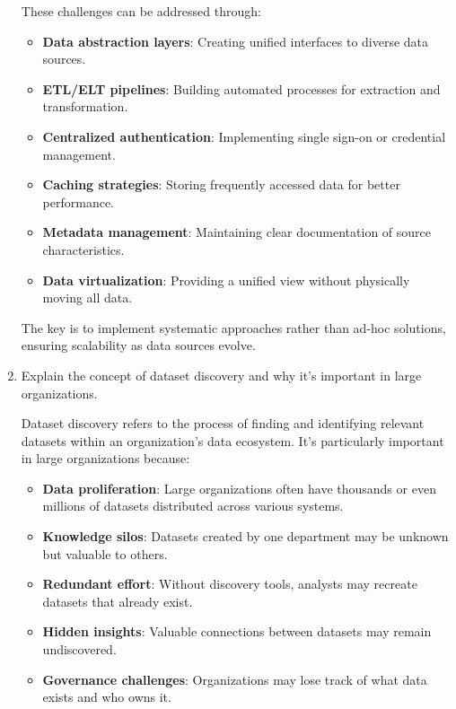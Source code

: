\documentclass[12pt]{article}
\begin{document}
\begin{enumerate}
\begin{tcolorbox}[colback=blue!5!white,colframe=blue!75!black,title=Solution]
    These challenges can be addressed through:
    
    \begin{itemize}
        \item \textbf{Data abstraction layers}: Creating unified interfaces to diverse data sources.
        \item \textbf{ETL/ELT pipelines}: Building automated processes for extraction and transformation.
        \item \textbf{Centralized authentication}: Implementing single sign-on or credential management.
        \item \textbf{Caching strategies}: Storing frequently accessed data for better performance.
        \item \textbf{Metadata management}: Maintaining clear documentation of source characteristics.
        \item \textbf{Data virtualization}: Providing a unified view without physically moving all data.
    \end{itemize}
    
    The key is to implement systematic approaches rather than ad-hoc solutions, ensuring scalability as data sources evolve.
    \end{tcolorbox}
    
    \item Explain the concept of dataset discovery and why it's important in large organizations.
    
    \begin{tcolorbox}[colback=blue!5!white,colframe=blue!75!black,title=Solution]
    Dataset discovery refers to the process of finding and identifying relevant datasets within an organization's data ecosystem. It's particularly important in large organizations because:
    
    \begin{itemize}
        \item \textbf{Data proliferation}: Large organizations often have thousands or even millions of datasets distributed across various systems.
        \item \textbf{Knowledge silos}: Datasets created by one department may be unknown but valuable to others.
        \item \textbf{Redundant effort}: Without discovery tools, analysts may recreate datasets that already exist.
        \item \textbf{Hidden insights}: Valuable connections between datasets may remain undiscovered.
        \item \textbf{Governance challenges}: Organizations may lose track of what data exists and who owns it.
    \end{itemize}
    

\end{tcolorbox}
\end{enumerate}
\end{document}
